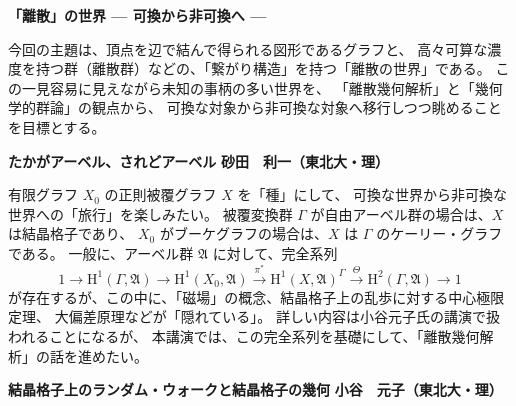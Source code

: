 \documentclass[uplatex,dvipdfmx]{jlreq}
\begin{document}
\begin{center}
  \vspace*{20pt}
  {\Huge\bfseries 「離散」の世界 --- 可換から非可換へ ---}
\end{center}

\vspace{4mm}

\begin{center}
  \parbox{140mm}{
    今回の主題は、頂点を辺で結んで得られる図形であるグラフと、
    高々可算な濃度を持つ群（離散群）などの、「繋がり構造」を持つ「離散の世界」である。
    この一見容易に見えながら未知の事柄の多い世界を、
    「離散幾何解析」と「幾何学的群論」の観点から、
    可換な対象から非可換な対象へ移行しつつ眺めることを目標とする。
  }
\end{center}

\vfill

\newpage

\noindent
{\large\bfseries たかがアーベル、されどアーベル}
\hfill
{\large\bfseries 砂田　利一（東北大・理）}

\bigskip

有限グラフ $X_0$ の正則被覆グラフ $X$ を「種」にして、
可換な世界から非可換な世界への「旅行」を楽しみたい。
被覆変換群 $\Gamma$ が自由アーベル群の場合は、$X$ は結晶格子であり、
$X_0$ がブーケグラフの場合は、$X$ は $\Gamma$ のケーリー・グラフである。
一般に、アーベル群 $\mathfrak{A}$ に対して、完全系列
\[
  1 \to \mathrm{H}^1(\Gamma, \mathfrak{A})
  \to \mathrm{H}^1(X_0, \mathfrak{A})
  \xrightarrow{\pi^*} \mathrm{H}^1(X, \mathfrak{A})^\Gamma
  \xrightarrow{\Theta} \mathrm{H}^2(\Gamma, \mathfrak{A})
  \to 1
\]
が存在するが、この中に、「磁場」の概念、結晶格子上の乱歩に対する中心極限定理、
大偏差原理などが「隠れている」。
詳しい内容は小谷元子氏の講演で扱われることになるが、
本講演では、この完全系列を基礎にして、「離散幾何解析」の話を進めたい。

\newpage

\noindent
{\large\bfseries 結晶格子上のランダム・ウォークと結晶格子の幾何}
\hfill
{\large\bfseries 小谷　元子（東北大・理）}
\end{document}
